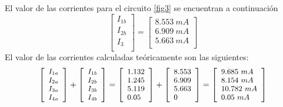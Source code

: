 \documentclass[twocolumn]{IEEEtran}
\begin{document}
El valor de las corrientes para el circuito \ref{fig3} se encuentran a continuación
\begin{equation}
 \left[ \begin{array}{l}
 {I_{1b}} \\ 
 {I_{2b}} \\ 
 {I_{3}} \\ 
 \end{array} \right] = \left[ \begin{array}{l}
 8.553 \ mA \\ 
 6.909 \ mA \\ 
 5.663 \ mA \\ 
 \end{array} \right]
\end{equation}
\noindent
El valor de las corrientes calculadas teóricamente son las siguientes:
\begin{equation}
\footnotesize
 \left[ \begin{array}{l}
 {I_{1a}} \\ 
 {I_{2a}} \\ 
 {I_{3a}} \\ 
 {I_{4a}} \\ 
 \end{array} \right] + \left[ \begin{array}{l}
 {I_{1b}} \\ 
 {I_{2b}} \\ 
 {I_{3b}} \\ 
 {I_{4b}} \\ 
 \end{array} \right] = \left[ \begin{array}{l}
 1.132 \\ 
 1.245 \\ 
 5.119 \\ 
 0.05 \\ 
 \end{array} \right] + \left[ \begin{array}{l}
 8.553 \\ 
 6.909 \\ 
 5.663 \\ 
 0 \\ 
 \end{array} \right] = \left[ \begin{array}{l}
 9.685 \ mA \\ 
 8.154 \ mA \\ 
 10.782 \ mA \\ 
 0.05 \ mA \\ 
 \end{array} \right]
\end{equation}
\end{document}
